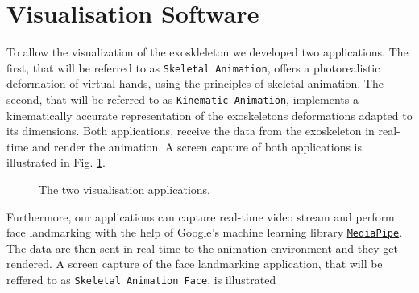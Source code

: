 \section{Visualisation Software}
To allow the visualization of the exoskleleton we developed two 
applications. The first, that will be referred to as \texttt{Skeletal 
Animation}, offers a photorealistic deformation of virtual hands, using the
principles of skeletal animation. The second, that will be referred to as
\texttt{Kinematic Animation}, implements a kinematically accurate
representation of the exoskeletons deformations adapted to its dimensions.
Both applications, receive the data from the exoskeleton in real-time and 
render the animation. A screen capture of both applications is
illustrated in Fig. \ref{fig:visualisation_applications}.
\begin{figure}[h]
    \centering
    \qquad
    \caption{The two visualisation applications.}
    \label{fig:visualisation_applications}
\end{figure}
Furthermore, our applications can capture real-time video stream and 
perform face landmarking with the help of Google's machine learning library 
\texttt{\href{https://google.github.io/mediapipe/solutions/face_mesh.html}{MediaPipe}}.
The data are then sent in real-time to the animation environment and they 
get rendered. A screen capture of the face landmarking application, that 
will be reffered to as \texttt{Skeletal Animation Face}, is illustrated
